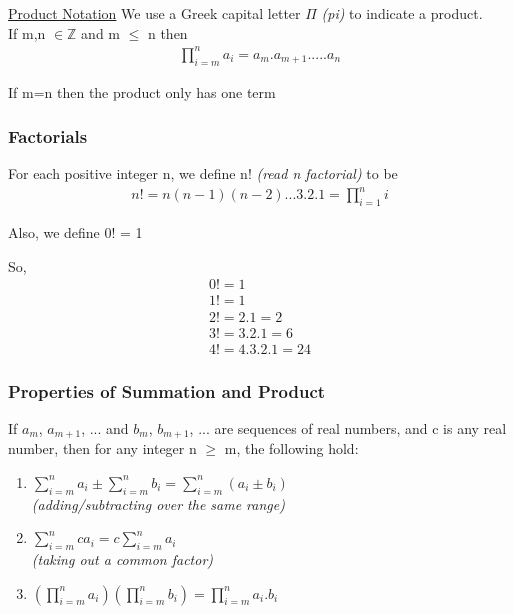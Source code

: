 \documentclass{article}
\begin{document}
\underline{Product Notation}
We use a Greek capital letter $\Pi$ \textit{(pi)} to indicate a product. \\

If m,n $\in \mathbb{Z}$ and m $\leq$ n then
\begin{align}
\prod_{i=m}^{n} a_{i} = a_{m} . a_{m+1} . ... . a_{n}
\end{align}

If m=n then the product only has one term

\subsubsection{Factorials}

For each positive integer n, we define n! \textit{(read n factorial)} to be
\begin{align}
n! = n(n-1)(n-2) ... 3.2.1 = \prod_{i=1}^{n} i
\end{align}

Also, we define 0! = 1

So,
\begin{align}
0! = 1 \\
1! = 1 \\
2! = 2.1 = 2 \\
3! = 3.2.1 = 6 \\
4! = 4.3.2.1 = 24
\end{align}

\subsubsection{Properties of Summation and Product}

If $a_{m}$, $a_{m+1}$, ... and $b_{m}$, $b_{m+1}$, ... are sequences of real numbers, and c is any real number, then for any integer n $\geq$ m, the following hold:
\begin{enumerate}
\item $\sum_{i=m}^{n} a_{i} \pm \sum_{i=m}^{n} b_{i} =  \sum_{i=m}^{n} (a_{i} \pm b_{i})$ \\
\textit{(adding/subtracting over the same range)}

\item $\sum_{i=m}^{n} ca_{i} = c\sum_{i=m}^{n} a_{i}$ \\
\textit{(taking out a common factor)}

\item $(\prod_{i=m}^{n} a_{i}) (\prod_{i=m}^{n} b_{i}) = \prod_{i=m}^{n} a_{i}.b_{i}$
\end{enumerate}
\end{document}
